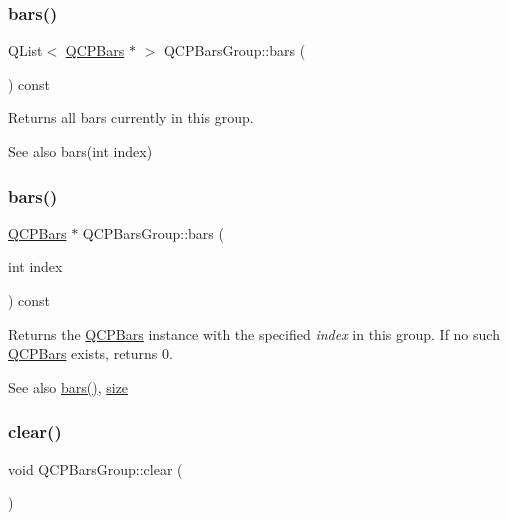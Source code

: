 \subsubsection{\texorpdfstring{bars()}{bars()}\hspace{0.1cm}{\footnotesize\ttfamily [1/2]}}
{\footnotesize\ttfamily Q\+List$<$ \hyperlink{classQCPBars}{Q\+C\+P\+Bars} $\ast$ $>$ Q\+C\+P\+Bars\+Group\+::bars (\begin{DoxyParamCaption}{ }\end{DoxyParamCaption}) const\hspace{0.3cm}{\ttfamily [inline]}}

Returns all bars currently in this group.

\begin{DoxySeeAlso}{See also}
bars(int index) 
\end{DoxySeeAlso}
\mbox{\label{classQCPBarsGroup_a0754d659a020aa7fddfe81e657ce2d92}} 
\subsubsection{\texorpdfstring{bars()}{bars()}\hspace{0.1cm}{\footnotesize\ttfamily [2/2]}}
{\footnotesize\ttfamily \hyperlink{classQCPBars}{Q\+C\+P\+Bars} $\ast$ Q\+C\+P\+Bars\+Group\+::bars (\begin{DoxyParamCaption}\item[{int}]{index }\end{DoxyParamCaption}) const}

Returns the \hyperlink{classQCPBars}{Q\+C\+P\+Bars} instance with the specified {\itshape index} in this group. If no such \hyperlink{classQCPBars}{Q\+C\+P\+Bars} exists, returns 0.

\begin{DoxySeeAlso}{See also}
\hyperlink{classQCPBarsGroup_a6e4f4e86abbec6a9342f204ef82abef8}{bars()}, \hyperlink{classQCPBarsGroup_a3780ec77919cb00840207ec7a0f00dd5}{size} 
\end{DoxySeeAlso}
\mbox{\label{classQCPBarsGroup_a3ddf23928c6cd89530bd34ab7ba7b177}} 
\subsubsection{\texorpdfstring{clear()}{clear()}}
{\footnotesize\ttfamily void Q\+C\+P\+Bars\+Group\+::clear (\begin{DoxyParamCaption}{ }\end{DoxyParamCaption})}

